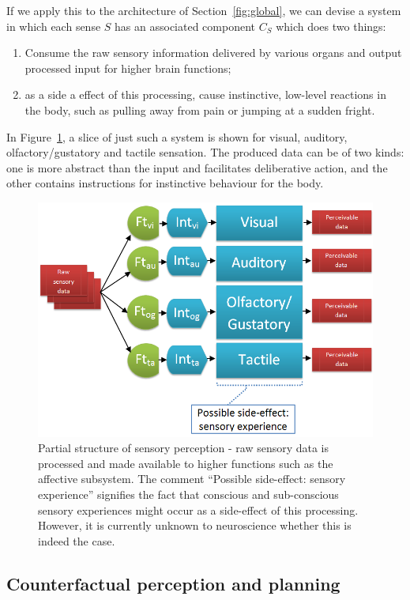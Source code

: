 If we apply this to the architecture of Section~\ref{fig:global}, we can devise a system in which each sense $S$ has an associated component $C_S$ which does two things:
\begin{enumerate}
	\item Consume the raw sensory information delivered by various organs and output processed input for higher brain functions;
	\item as a side a effect of this processing, cause  instinctive, low-level reactions in the body, such as pulling away from pain or jumping at a sudden fright.
\end{enumerate}

In Figure~\ref{fig:sensoryPerception}, a slice of just such a system is shown for visual, auditory, olfactory/gustatory and tactile sensation. The produced data can be of two kinds: one is more abstract than the input and facilitates deliberative action, and the other contains instructions for instinctive behaviour for the body.

\begin{figure}[!h]
	\centering
	\includegraphics[width=325pt]{figs/sensoryPerception.png}
	\caption{Partial structure of sensory perception - raw sensory data is processed and made available to higher functions such as the affective subsystem. The comment ``Possible side-effect: sensory experience'' signifies the fact that conscious and sub-conscious sensory experiences might occur as a side-effect of this processing. However, it is currently unknown to neuroscience whether this is indeed the case.}
	\label{fig:sensoryPerception}
\end{figure}


\subsection{Counterfactual perception and planning}\label{sec:worldSimulation}

